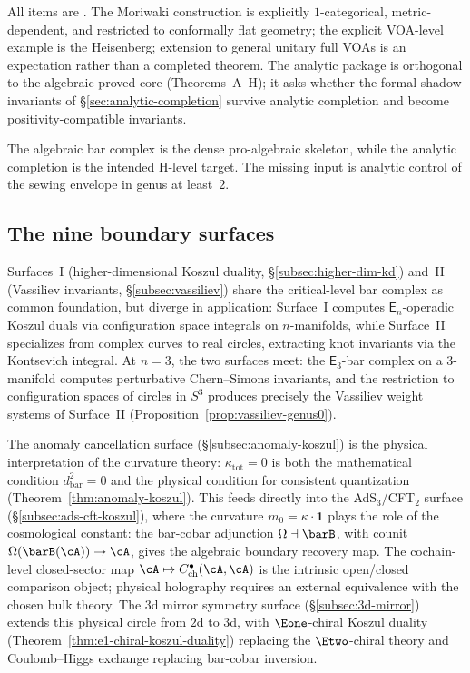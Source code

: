 \begin{remark}[Scope]\label{rem:analytic-programme-scope}
All items are \ClaimStatusConjectured{}. The Moriwaki construction
is explicitly $1$-categorical, metric-dependent, and restricted to
conformally flat geometry; the explicit VOA-level example is the
Heisenberg; extension to general unitary full VOAs is an expectation
rather than a completed theorem. The analytic package is orthogonal to the
algebraic proved core (Theorems~A--H); it asks whether the formal
shadow invariants of \S\ref{sec:analytic-completion} survive analytic
completion and become positivity-compatible invariants.

The algebraic bar complex is the dense pro-algebraic skeleton, while
the analytic completion is the intended H-level target. The missing
input is analytic control of the sewing envelope in genus at least~$2$.
\end{remark}

\subsection{The nine boundary surfaces}
\label{subsec:programme-synthesis}

Surfaces~I (higher-dimensional Koszul duality,
\S\ref{subsec:higher-dim-kd}) and~II (Vassiliev invariants,
\S\ref{subsec:vassiliev}) share the critical-level bar complex
as common foundation, but diverge in application: Surface~I
computes $\mathsf{E}_n$-operadic Koszul duals via configuration
space integrals on $n$-manifolds, while Surface~II specializes
from complex curves to real circles, extracting knot invariants via
the Kontsevich integral. At $n = 3$, the two surfaces meet:
the $\mathsf{E}_3$-bar complex on a $3$-manifold computes
perturbative Chern--Simons invariants, and the restriction to
configuration spaces of circles in $S^3$ produces precisely the
Vassiliev weight systems of Surface~II
(Proposition~\ref{prop:vassiliev-genus0}).

The anomaly cancellation surface
(\S\ref{subsec:anomaly-koszul}) is the physical interpretation of
the curvature theory: $\kappa_{\mathrm{tot}} = 0$ is both the
mathematical condition $d_{\mathrm{bar}}^2 = 0$ and the
physical condition for consistent quantization
(Theorem~\ref{thm:anomaly-koszul}). This feeds directly into the
AdS$_3$/CFT$_2$ surface (\S\ref{subsec:ads-cft-koszul}), where
the curvature $m_0 = \kappa \cdot \mathbf{1}$ plays the role of
the cosmological constant: the bar-cobar adjunction
$\Omega \dashv \barB$, with counit
$\Omega(\barB(\cA)) \to \cA$, gives the algebraic boundary recovery
map.  The cochain-level closed-sector map
$\cA \mapsto C^\bullet_{\mathrm{ch}}(\cA,\cA)$ is the intrinsic
open/closed comparison object; physical holography requires an
external equivalence with the chosen bulk theory.
The $3$d mirror symmetry surface (\S\ref{subsec:3d-mirror})
extends this physical circle from $2$d to $3$d, with
$\Eone$-chiral Koszul duality
(Theorem~\ref{thm:e1-chiral-koszul-duality}) replacing the
$\Etwo$-chiral theory and Coulomb--Higgs exchange replacing
bar-cobar inversion.

